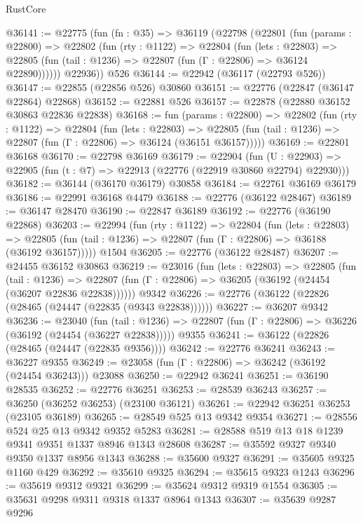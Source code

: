 \begin{lexlean}{RustCore}
\begin{coremodule}
@36141 := @22775
    (fun (fn : @35) =>
    @36119
      (@22798
        (@22801
          (fun (params : @22800) =>
          @22802
            (fun (rty : @1122) =>
            @22804
              (fun (lets : @22803) =>
              @22805 (fun (tail : @1236) => @22807 (fun (Γ : @22806) => @36124 @22890))))))
        @22936))
    @526
@36144 := @22942 (@36117 (@22793 @526))
@36147 := @22855 (@22856 @526) @30860
@36151 := @22776 (@22847 (@36147 @22864) @22868)
@36152 := @22881 @526
@36157 := @22878 (@22880 @36152 @30863 @22836 @22838)
@36168 := fun (params : @22800) =>
  @22802
    (fun (rty : @1122) =>
    @22804
      (fun (lets : @22803) =>
      @22805 (fun (tail : @1236) => @22807 (fun (Γ : @22806) => @36124 (@36151 @36157)))))
@36169 := @22801 @36168
@36170 := @22798 @36169
@36179 := @22904
    (fun (U : @22903) => @22905 (fun (t : @7) => @22913 (@22776 (@22919 @30860 @22794) @22930)))
@36182 := @36144 (@36170 @36179) @30858
@36184 := @22761 @36169 @36179
@36186 := @22991 @36168 @4479
@36188 := @22776 (@36122 @28467)
@36189 := @36147 @28470
@36190 := @22847 @36189
@36192 := @22776 (@36190 @22868)
@36203 := @22994
    (fun (rty : @1122) =>
    @22804
      (fun (lets : @22803) =>
      @22805 (fun (tail : @1236) => @22807 (fun (Γ : @22806) => @36188 (@36192 @36157)))))
    @1504
@36205 := @22776 (@36122 @28487)
@36207 := @24455 @36152 @30863
@36219 := @23016
    (fun (lets : @22803) =>
    @22805
      (fun (tail : @1236) =>
      @22807 (fun (Γ : @22806) => @36205 (@36192 (@24454 (@36207 @22836 @22838))))))
    @9342
@36226 := @22776 (@36122 (@22826 (@28465 (@24447 (@22835 (@9343 @22838))))))
@36227 := @36207 @9342
@36236 := @23040
    (fun (tail : @1236) => @22807 (fun (Γ : @22806) => @36226 (@36192 (@24454 (@36227 @22838)))))
    @9355
@36241 := @36122 (@22826 (@28465 (@24447 (@22835 @9356))))
@36242 := @22776 @36241
@36243 := @36227 @9355
@36249 := @23058 (fun (Γ : @22806) => @36242 (@36192 (@24454 @36243))) @23088
@36250 := @22942 @36241
@36251 := @36190 @28535
@36252 := @22776 @36251
@36253 := @28539 @36243
@36257 := @36250 (@36252 @36253) (@23100 @36121)
@36261 := @22942 @36251 @36253 (@23105 @36189)
@36265 := @28549 @525 @13 @9342 @9354
@36271 := @28556 @524 @25 @13 @9342 @9352 @5283
@36281 := @28588 @519 @13 @18 @1239 @9341 @9351 @1337 @8946 @1343 @28608
@36287 := @35592 @9327 @9340 @9350 @1337 @8956 @1343
@36288 := @35600 @9327
@36291 := @35605 @9325 @1160 @429
@36292 := @35610 @9325
@36294 := @35615 @9323 @1243
@36296 := @35619 @9312 @9321
@36299 := @35624 @9312 @9319 @1554
@36305 := @35631 @9298 @9311 @9318 @1337 @8964 @1343
@36307 := @35639 @9287 @9296

\end{coremodule}
\end{lexlean}
